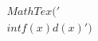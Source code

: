 \documentclass[preview]{standalone}
\begin{document}
\begin{align*}
MathTex('\\int f(x) d(x)')
\end{align*}
\end{document}
